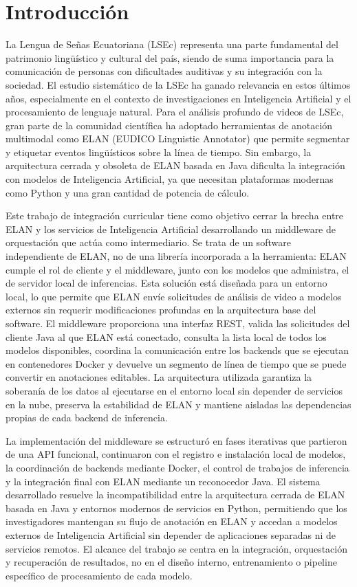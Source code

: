 \section{Introducción}
La Lengua de Señas Ecuatoriana (LSEc) representa una parte fundamental del patrimonio lingüístico y cultural del país, siendo de suma importancia para la comunicación de personas con dificultades auditivas y su integración con la sociedad. El estudio sistemático de la LSEc ha ganado relevancia en estos últimos años, especialmente en el contexto de investigaciones en Inteligencia Artificial y el procesamiento de lenguaje natural. Para el análisis profundo de videos de LSEc, gran parte de la comunidad científica ha adoptado herramientas de anotación multimodal como ELAN (EUDICO Linguistic Annotator) que permite segmentar y etiquetar eventos lingüísticos sobre la línea de tiempo. Sin embargo, la arquitectura cerrada y obsoleta de ELAN basada en Java dificulta la integración con modelos de Inteligencia Artificial, ya que necesitan plataformas modernas como Python y una gran cantidad de potencia de cálculo.

Este trabajo de integración curricular tiene como objetivo cerrar la brecha entre ELAN y los servicios de Inteligencia Artificial desarrollando un middleware de orquestación que actúa como intermediario. Se trata de un software independiente de ELAN, no de una librería incorporada a la herramienta: ELAN cumple el rol de cliente y el middleware, junto con los modelos que administra, el de servidor local de inferencias. Esta solución está diseñada para un entorno local, lo que permite que ELAN envíe solicitudes de análisis de video a modelos externos sin requerir modificaciones profundas en la arquitectura base del software. El middleware proporciona una interfaz REST, valida las solicitudes del cliente Java al que ELAN está conectado, consulta la lista local de todos los modelos disponibles, coordina la comunicación entre los backends que se ejecutan en contenedores Docker y devuelve un segmento de línea de tiempo que se puede convertir en anotaciones editables. La arquitectura utilizada garantiza la soberanía de los datos al ejecutarse en el entorno local sin depender de servicios en la nube, preserva la estabilidad de ELAN y mantiene aisladas las dependencias propias de cada backend de inferencia.

La implementación del middleware se estructuró en fases iterativas que partieron de una API funcional, continuaron con el registro e instalación local de modelos, la coordinación de backends mediante Docker, el control de trabajos de inferencia y la integración final con ELAN mediante un reconocedor Java. El sistema desarrollado resuelve la incompatibilidad entre la arquitectura cerrada de ELAN basada en Java y entornos modernos de servicios en Python, permitiendo que los investigadores mantengan su flujo de anotación en ELAN y accedan a modelos externos de Inteligencia Artificial sin depender de aplicaciones separadas ni de servicios remotos. El alcance del trabajo se centra en la integración, orquestación y recuperación de resultados, no en el diseño interno, entrenamiento o pipeline específico de procesamiento de cada modelo.


